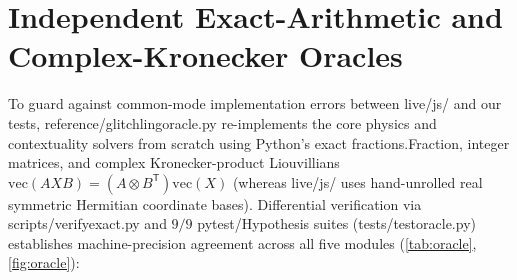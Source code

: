 \documentclass[11pt,a4paper]{article}
\numberwithin{equation}{section}
\theoremstyle{plain}
\theoremstyle{definition}
\theoremstyle{remark}
\newcommand{\code}[1]{{\ttfamily\footnotesize\def\_{\textunderscore\penalty0\hskip0pt}#1}}
\begin{document}
\section{Independent Exact-Arithmetic and Complex-Kronecker Oracles}
\label{sec:oracle}

To guard against common-mode implementation errors between \code{live/js/} and our tests, \code{reference/glitchling\_oracle.py} re-implements the core physics and contextuality solvers from scratch using Python's exact \code{fractions.Fraction}, integer matrices, and complex Kronecker-product Liouvillians $\mathrm{vec}(AXB) = (A \otimes B^{\mathsf{T}})\mathrm{vec}(X)$ (whereas \code{live/js/} uses hand-unrolled real symmetric Hermitian coordinate bases). Differential verification via \code{scripts/verify\_exact.py} and $9/9$ \code{pytest}/\code{Hypothesis} suites (\code{tests/test\_oracle.py}) establishes machine-precision agreement across all five modules (\cref{tab:oracle}, \cref{fig:oracle}):
\end{document}
